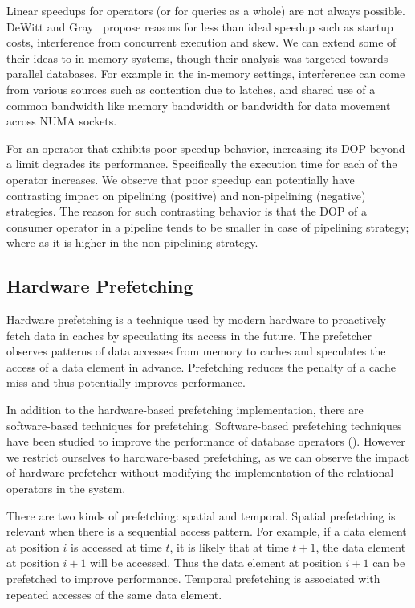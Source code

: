 Linear speedups for operators (or for queries as a whole) are not always possible.
DeWitt and Gray~\cite{DBLP:journals/cacm/DeWittG92} propose reasons for less than ideal speedup such as startup costs, interference from concurrent execution and skew.
We can extend some of their ideas to in-memory systems, though their analysis was targeted towards parallel databases. 
For example in the in-memory settings, interference can come from various sources such as contention due to latches, and shared use of a common bandwidth like memory bandwidth or bandwidth for data movement across NUMA sockets.

For an operator that exhibits poor speedup behavior, increasing its DOP beyond a limit degrades its performance.
Specifically the execution time for each \wo{} of the operator increases. 
We observe that poor speedup can potentially have contrasting impact on pipelining (positive) and non-pipelining (negative) strategies.
The reason for such contrasting behavior is that the DOP of a consumer operator in a pipeline tends to be smaller in case of pipelining strategy; where as it is higher in the non-pipelining strategy.

\subsection{Hardware Prefetching}
Hardware prefetching is a technique used by modern hardware to proactively fetch data in caches by speculating its access in the future.
The prefetcher observes patterns of data accesses from memory to caches and speculates the access of a data element in advance.
Prefetching reduces the penalty of a cache miss and thus potentially improves performance.

In addition to the hardware-based prefetching implementation, there are software-based techniques for prefetching.
Software-based prefetching techniques have been studied to improve the performance of database operators (\cite{rof,  DBLP:conf/icde/ChenAGM04}).
However we restrict ourselves to hardware-based prefetching, as we can observe the impact of hardware prefetcher without modifying the implementation of the relational operators in the system.

There are two kinds of prefetching: spatial and temporal. 
Spatial prefetching is relevant when there is a sequential access pattern. 
For example, if a data element at position $i$ is accessed at time $t$, it is likely that at time $t + 1$, the data element at position $i + 1$ will be accessed.
Thus the data element at position $i + 1$ can be prefetched to improve performance.
Temporal prefetching is associated with repeated accesses of the same data element.

